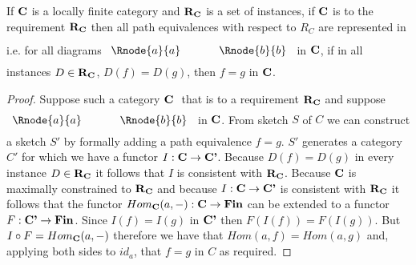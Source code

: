 \begin{lemma}
If $\textbf{C}$ is a locally finite category and $\textbf{R}_{\textbf{C}}$ is a set of instances, if $\textbf{C}$ is 
 to the requirement $\textbf{R}_{\textbf{C}}$ then all path equivalences with respect
to $R_C$ are represented in \catcw
i.e. for all diagrams
$
\rule[-0.3cm]{0pt}{0.9cm} %
\begin{array}{c p{0.5cm} c  }
 \Rnode{a}{a}            &&   \Rnode{b}{b}
\end{array} 
$
in $\textbf{C}$,  if in all instances $D \in \textbf{R}_{\textbf{C}}$, $D(f)=D(g)$, 
then $f=g$ in $\textbf{C}$.
\end{lemma}
\begin{proof}
Suppose such a category  $\textbf{C}\ $  that  is 
 to a requirement $\textbf{R}_{\textbf{C}}$
and suppose 
$
\rule[-0.3cm]{0pt}{0.8cm} %
\begin{array}{c p{0.5cm} c  }
 \Rnode{a}{a}            &&   \Rnode{b}{b}
\end{array} 
$
in $\textbf{C}$. From sketch $S$ of $C$ we can construct a sketch $S'$ by formally adding a path equivalence $f=g$.
$S'$ generates a category $C'$ for which we have a functor $I: \textbf{C} \rightarrow \textbf{C'}$. 
Because $D(f) = D(g)$ in every instance $D \in \textbf{R}_{\textbf{C}}$
it follows that $I$ is consistent with $\textbf{R}_{\textbf{C}}$. Because $\textbf{C}$ is maximally constrained to $\textbf{R}_{\textbf{C}}$
and because $I: \textbf{C} \rightarrow \textbf{C'}$ is consistent with $\textbf{R}_{\textbf{C}}$ it follows that the functor $Hom_{\textbf{C}}(a,-): \textbf{C} \rightarrow \textbf{Fin}$ 
can be extended to a functor $F: \textbf{C'} \rightarrow \textbf{Fin}$. Since $I(f)=I(g)$ in $\textbf{C'}$ then $F(I(f))=F(I(g))$. But $I \circ F
= Hom_{\textbf{C}}(a,-)$ therefore we have that $Hom(a,f)=Hom(a,g)$ and, applying both sides to $id_a$, that $f=g$ in $C$ as required.
\end{proof}

